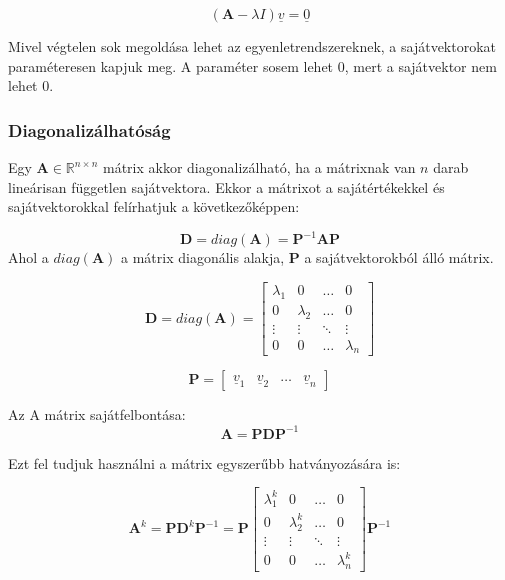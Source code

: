\documentclass{article}
\begin{document}
\begin{equation*}
    (\mathbf{A} - \lambda I)\underline{v} = \underline{0}
\end{equation*}

Mivel végtelen sok megoldása lehet az egyenletrendszereknek, a sa\-ját\-vek\-tor\-ok\-at pa\-ra\-mé\-ter\-es\-en kapjuk meg. A paraméter sosem lehet 0, mert a sajátvektor nem lehet 0.

\subsubsection{Diagonalizálhatóság}

Egy $\mathbf{A} \in \mathbb{R}^{n \times n}$ mátrix akkor diagonalizálható, ha a mátrixnak van $n$ darab li\-ne\-á\-ris\-an füg\-get\-len sajátvektora. Ekkor a mátrixot a sajátértékekkel és sa\-ját\-vek\-tor\-ok\-kal felírhatjuk a következőképpen:

\begin{equation*}
    \mathbf{D} = diag(\mathbf{A}) = \mathbf{P}^{-1}\mathbf{AP}
\end{equation*}
Ahol a $diag(\mathbf{A})$ a mátrix diagonális alakja, $\mathbf{P}$ a sajátvektorokból álló mátrix. 

\begin{equation*}
    \mathbf{D} = diag(\mathbf{A}) = \begin{bmatrix} \lambda_1 & 0 & \ldots & 0 \\ 0 & \lambda_2 & \ldots & 0 \\ \vdots & \vdots & \ddots & \vdots \\ 0 & 0 & \ldots & \lambda_n \end{bmatrix}
\end{equation*}

\begin{equation*}
    \mathbf{P} = \begin{bmatrix} \underline{v}_1 & \underline{v}_2 & \ldots & \underline{v}_n \end{bmatrix}
\end{equation*}

Az A mátrix sajátfelbontása:
\begin{equation*}
    \mathbf{A} = \mathbf{PDP}^{-1}
\end{equation*}

Ezt fel tudjuk használni a mátrix egyszerűbb hatványozására is:

\begin{equation*}
    \mathbf{A}^k = \mathbf{PD}^k\mathbf{P}^{-1} = \mathbf{P} \begin{bmatrix} \lambda_1^k & 0 & \ldots & 0 \\ 0 & \lambda_2^k & \ldots & 0 \\ \vdots & \vdots & \ddots & \vdots \\ 0 & 0 & \ldots & \lambda_n^k \end{bmatrix} \mathbf{P}^{-1}
\end{equation*}
\end{document}
